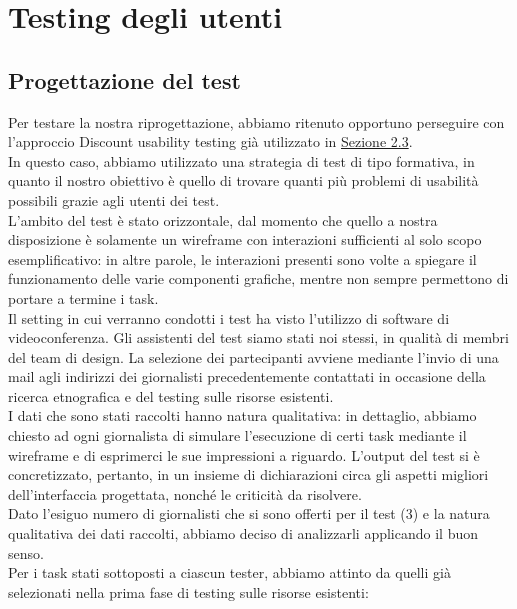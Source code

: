 \section{Testing degli utenti}
\label{s:testing-utenti}

\subsection{Progettazione del test}
\label{ss:vd-progettazione-test}
Per testare la nostra riprogettazione, abbiamo ritenuto opportuno perseguire con l'approccio Discount usability testing già utilizzato in \hyperref[s:verifica-risorse-esistenti-testing-utenti]{Sezione 2.3}.\\
In questo caso, abbiamo utilizzato una strategia di test di tipo formativa, in quanto il nostro obiettivo è quello di trovare quanti più problemi di usabilità possibili grazie agli utenti dei test.\\
L'ambito del test è stato orizzontale, dal momento che quello a nostra disposizione è solamente un wireframe con interazioni sufficienti al solo scopo esemplificativo: in altre parole, le interazioni presenti sono volte a spiegare il funzionamento delle varie componenti grafiche, mentre non sempre permettono di portare a termine i task.\\
Il setting in cui verranno condotti i test ha visto l'utilizzo di software di videoconferenza. Gli assistenti del test siamo stati noi stessi, in qualità di membri del team di design. La selezione dei partecipanti avviene mediante l'invio di una mail agli indirizzi dei giornalisti precedentemente contattati in occasione della ricerca etnografica e del testing sulle risorse esistenti.\\
I dati che sono stati raccolti hanno natura qualitativa: in dettaglio, abbiamo chiesto ad ogni giornalista di simulare l'esecuzione di certi task mediante il wireframe e di esprimerci le sue impressioni a riguardo. L'output del test si è concretizzato, pertanto, in un insieme di dichiarazioni circa gli aspetti migliori dell'interfaccia progettata, nonché le criticità da risolvere.\\
Dato l'esiguo numero di giornalisti che si sono offerti per il test (3) e la natura qualitativa dei dati raccolti, abbiamo deciso di analizzarli applicando il buon senso.\\
Per i task stati sottoposti a ciascun tester, abbiamo attinto da quelli già selezionati nella prima fase di testing sulle risorse esistenti:
